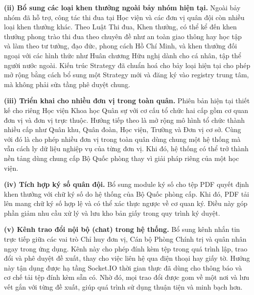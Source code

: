 \documentclass[../DoAn.tex]{subfiles}
\begin{document}
\textbf{(ii) Bổ sung các loại khen thưởng ngoài bảy nhóm hiện tại.} Ngoài bảy nhóm đã hỗ trợ, công tác thi đua tại Học viện và các đơn vị quân đội còn nhiều loại khen thưởng khác.
Theo Luật Thi đua, Khen thưởng, có thể kể đến khen thưởng phong trào thi đua theo chuyên đề như an toàn giao thông hay học tập và làm theo tư tưởng, đạo đức, phong cách Hồ Chí Minh, và khen thưởng đối ngoại với các hình thức như Huân chương Hữu nghị dành cho cá nhân, tập thể người nước ngoài.
Kiến trúc Strategy đã chuẩn hoá cho bảy loại hiện tại cho phép mở rộng bằng cách bổ sung một Strategy mới và đăng ký vào registry trung tâm, mà không phải sửa tầng phê duyệt chung.

\textbf{(iii) Triển khai cho nhiều đơn vị trong toàn quân.} Phiên bản hiện tại thiết kế cho riêng Học viện Khoa học Quân sự với cơ cấu tổ chức hai cấp gồm cơ quan đơn vị và đơn vị trực thuộc.
Hướng tiếp theo là mở rộng mô hình tổ chức thành nhiều cấp như Quân khu, Quân đoàn, Học viện, Trường và Đơn vị cơ sở.
Cùng với đó là cho phép nhiều đơn vị trong toàn quân dùng chung một hệ thống mà vẫn cách ly dữ liệu nghiệp vụ của từng đơn vị.
Khi đó, hệ thống có thể trở thành nền tảng dùng chung cấp Bộ Quốc phòng thay vì giải pháp riêng của một học viện.

\textbf{(iv) Tích hợp ký số quân đội.} Bổ sung module ký số cho tệp PDF quyết định khen thưởng với chữ ký số do hệ thống của Bộ Quốc phòng cấp.
Khi đó, PDF tải lên mang chữ ký số hợp lệ và có thể xác thực ngược về cơ quan ký.
Điều này góp phần giảm nhu cầu xử lý và lưu kho bản giấy trong quy trình ký duyệt.

\textbf{(v) Kênh trao đổi nội bộ (chat) trong hệ thống.} Bổ sung kênh nhắn tin trực tiếp giữa các vai trò Chỉ huy đơn vị, Cán bộ Phòng Chính trị và quân nhân ngay trong ứng dụng.
Kênh này cho phép đính kèm tệp trong quá trình lập, trao đổi và phê duyệt đề xuất, thay cho việc liên hệ qua điện thoại hay giấy tờ.
Hướng này tận dụng được hạ tầng Socket.IO thời gian thực đã dùng cho thông báo và cơ chế tải tệp đính kèm sẵn có.
Nhờ đó, mọi trao đổi được gom về một nơi và lưu vết gắn với từng đề xuất, giúp quá trình sử dụng thuận tiện và minh bạch hơn.
\end{document}
